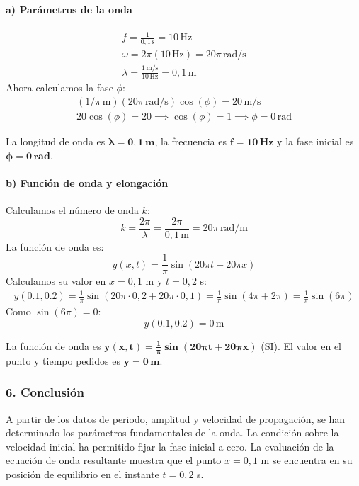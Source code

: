 \paragraph*{a) Parámetros de la onda}
\begin{gather}
    f = \frac{1}{0,1\,\text{s}} = 10\,\text{Hz} \\
    \omega = 2\pi (10\,\text{Hz}) = 20\pi\,\text{rad/s} \\
    \lambda = \frac{1\,\text{m/s}}{10\,\text{Hz}} = 0,1\,\text{m}
\end{gather}
Ahora calculamos la fase $\phi$:
\begin{gather}
    (1/\pi\,\text{m})(20\pi\,\text{rad/s})\cos(\phi) = 20\,\text{m/s} \\
    20 \cos(\phi) = 20 \implies \cos(\phi) = 1 \implies \phi = 0\,\text{rad}
\end{gather}
\begin{cajaresultado}
La longitud de onda es $\boldsymbol{\lambda=0,1\,\textbf{m}}$, la frecuencia es $\boldsymbol{f=10\,\textbf{Hz}}$ y la fase inicial es $\boldsymbol{\phi=0\,\textbf{rad}}$.
\end{cajaresultado}

\paragraph*{b) Función de onda y elongación}
Calculamos el número de onda $k$:
$$ k = \frac{2\pi}{\lambda} = \frac{2\pi}{0,1\,\text{m}} = 20\pi\,\text{rad/m} $$
La función de onda es:
$$ y(x,t) = \frac{1}{\pi} \sin(20\pi t + 20\pi x) $$
Calculamos su valor en $x=0,1$ m y $t=0,2$ s:
\begin{gather}
    y(0.1, 0.2) = \frac{1}{\pi} \sin(20\pi \cdot 0,2 + 20\pi \cdot 0,1) = \frac{1}{\pi} \sin(4\pi + 2\pi) = \frac{1}{\pi} \sin(6\pi)
\end{gather}
Como $\sin(6\pi)=0$:
$$ y(0.1, 0.2) = 0\,\text{m} $$
\begin{cajaresultado}
La función de onda es $\boldsymbol{y(x,t) = \frac{1}{\pi} \sin(20\pi t + 20\pi x)}$ (SI). El valor en el punto y tiempo pedidos es $\boldsymbol{y=0\,\textbf{m}}$.
\end{cajaresultado}

\subsubsection*{6. Conclusión}
\begin{cajaconclusion}
A partir de los datos de periodo, amplitud y velocidad de propagación, se han determinado los parámetros fundamentales de la onda. La condición sobre la velocidad inicial ha permitido fijar la fase inicial a cero. La evaluación de la ecuación de onda resultante muestra que el punto $x=0,1$ m se encuentra en su posición de equilibrio en el instante $t=0,2$ s.
\end{cajaconclusion}
\newpage


